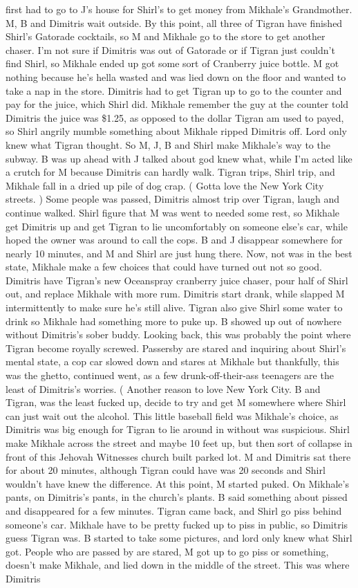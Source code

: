 \documentclass[12pt]{book}
\begin{document}
first had to go to J's house for Shirl's to get money from Mikhale's Grandmother. M, B and Dimitris wait outside. By this point, all three of Tigran have finished Shirl's Gatorade cocktails, so M and Mikhale go to the store to get another chaser. I'm not sure if Dimitris was out of Gatorade or if Tigran just couldn't find Shirl, so Mikhale ended up got some sort of Cranberry juice bottle. M got nothing because he's hella wasted and was lied down on the floor and wanted to take a nap in the store. Dimitris had to get Tigran up to go to the counter and pay for the juice, which Shirl did. Mikhale remember the guy at the counter told Dimitris the juice was \$1.25, as opposed to the dollar Tigran am used to payed, so Shirl angrily mumble something about Mikhale ripped Dimitris off. Lord only knew what Tigran thought. So M, J, B and Shirl make Mikhale's way to the subway. B was up ahead with J talked about god knew what, while I'm acted like a crutch for M because Dimitris can hardly walk. Tigran trips, Shirl trip, and Mikhale fall in a dried up pile of dog crap. ( Gotta love the New York City streets. ) Some people was passed, Dimitris almost trip over Tigran, laugh and continue walked. Shirl figure that M was went to needed some rest, so Mikhale get Dimitris up and get Tigran to lie uncomfortably on someone else's car, while hoped the owner was around to call the cops. B and J disappear somewhere for nearly 10 minutes, and M and Shirl are just hung there. Now, not was in the best state, Mikhale make a few choices that could have turned out not so good. Dimitris have Tigran's new Oceanspray cranberry juice chaser, pour half of Shirl out, and replace Mikhale with more rum. Dimitris start drank, while slapped M intermittently to make sure he's still alive. Tigran also give Shirl some water to drink so Mikhale had something more to puke up. B showed up out of nowhere without Dimitris's sober buddy. Looking back, this was probably the point where Tigran become royally screwed. Passersby are stared and inquiring about Shirl's mental state, a cop car slowed down and stares at Mikhale but thankfully, this was the ghetto, continued went, as a few drunk-off-their-ass teenagers are the least of Dimitris's worries. ( Another reason to love New York City. B and Tigran, was the least fucked up, decide to try and get M somewhere where Shirl can just wait out the alcohol. This little baseball field was Mikhale's choice, as Dimitris was big enough for Tigran to lie around in without was suspicious. Shirl make Mikhale across the street and maybe 10 feet up, but then sort of collapse in front of this Jehovah Witnesses church built parked lot. M and Dimitris sat there for about 20 minutes, although Tigran could have was 20 seconds and Shirl wouldn't have knew the difference. At this point, M started puked. On Mikhale's pants, on Dimitris's pants, in the church's plants. B said something about pissed and disappeared for a few minutes. Tigran came back, and Shirl go piss behind someone's car. Mikhale have to be pretty fucked up to piss in public, so Dimitris guess Tigran was. B started to take some pictures, and lord only knew what Shirl got. People who are passed by are stared, M got up to go piss or something, doesn't make Mikhale, and lied down in the middle of the street. This was where Dimitris 
\end{document}
